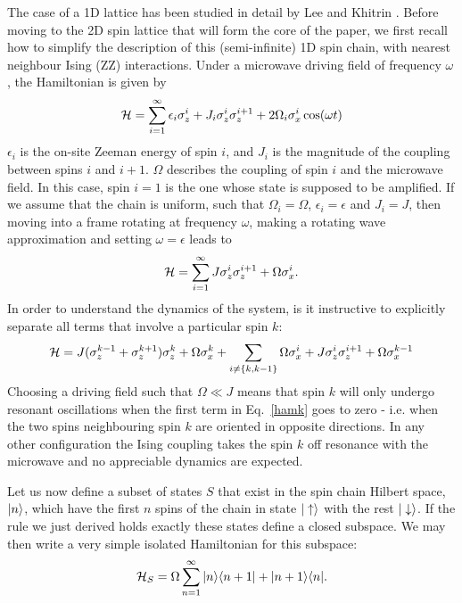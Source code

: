   The case of a 1D lattice has been studied in detail by Lee and Khitrin \cite{Lee:2005p6468}. Before moving to the 2D spin lattice that will form the core of the paper, we first recall how to simplify the description of this (semi-infinite) 1D spin chain, with nearest neighbour Ising (ZZ) interactions. Under a microwave driving field of frequency $\omega$, the Hamiltonian is given by
  \begin{equation} {\cal H} = \sum_{i=1}^{\infty} \epsilon_i \sigma^i_z
  + J_i \sigma_z^i\sigma_z^{i+1} + 2 \Omega_i \sigma_x^i \cos(\omega
      t)
  \end{equation}
  $\epsilon_i$ is the on-site Zeeman energy of spin $i$, and $J_i$ is the magnitude of the coupling between spins $i$ and $i+1$. $\Omega$ describes the coupling of spin $i$ and the microwave field. In this case, spin $i=1$ is the one whose state is supposed to be amplified. If we assume that the chain is uniform, such that $\Omega_i = \Omega$, $\epsilon_i = \epsilon$ and $J_i = J$, then moving into a frame rotating at frequency $\omega$, making a rotating wave approximation and setting $\omega = \epsilon$ leads to
  \begin{equation} {\cal H} = \sum_{i=1}^{\infty} J
  \sigma_z^i\sigma_z^{i+1} + \Omega \sigma_x^i .
  \end{equation}
  In order to understand the dynamics of the system, is it instructive to explicitly separate all terms that involve a particular spin $k$:
  \begin{equation} {\cal H} = J (\sigma_z^{k-1} +
      \sigma_z^{k+1})\sigma_z^k + \Omega \sigma^k_x + \sum_{i \neq \{k,
    k-1\}} \Omega\sigma_x^i + J \sigma_z^i\sigma_z^{i+1} +
    \Omega\sigma_x^{k-1}
    \label{hamk}
    \end{equation}
    Choosing a driving field such that $\Omega\ll J$ means that spin $k$ will only undergo resonant oscillations when the first term in Eq.~\ref{hamk} goes to zero - i.e. when the two spins neighbouring spin $k$ are oriented in opposite directions. In any other configuration the Ising coupling takes the spin $k$ off resonance with the microwave and no appreciable dynamics are expected.

    Let us now define a subset of states $S$ that exist in the spin chain Hilbert space, $\vert n\rangle$, which have the first $n$ spins of the chain in state $\vert\uparrow\rangle$ with the rest $\vert\downarrow\rangle$. If the rule we just derived holds exactly these states define a closed subspace. We may then write a very simple isolated Hamiltonian for this subspace:
    \begin{equation}
{\cal H}_S = \Omega \sum_{n=1}^\infty \vert n\rangle\langle  n+1\vert+\vert n+1\rangle\langle  n\vert.
\label{1d_ham}
\end{equation}

